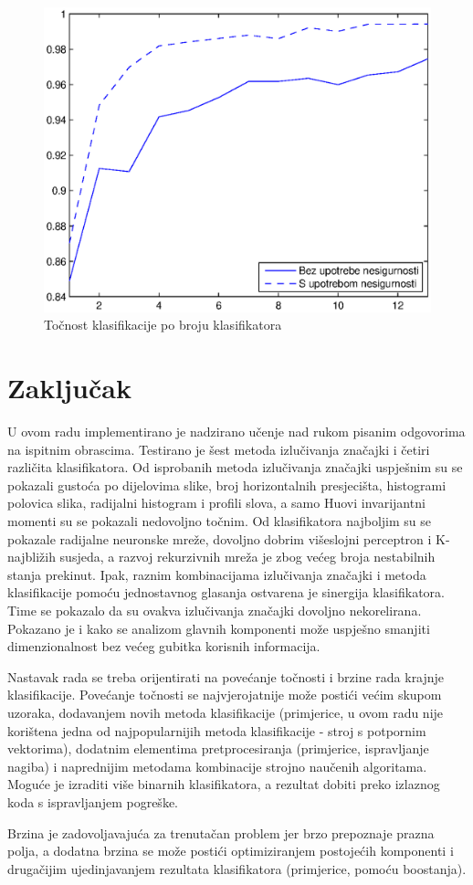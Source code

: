 \documentclass[a4paper,twocolumn,dvipdfm]{article}
\begin{document}
\begin{figure}
\centering
\includegraphics[scale=0.5]{accByClassifCount.eps}
\caption{Točnost klasifikacije po broju klasifikatora}
\label{figure:rezPoBrojuKlas}
\end{figure}


\section{Zaključak}
U ovom radu implementirano je nadzirano učenje nad rukom pisanim odgovorima na
ispitnim obrascima. Testirano je šest metoda izlučivanja značajki i četiri
različita klasifikatora. Od isprobanih metoda izlučivanja značajki uspješnim
su se pokazali gustoća po dijelovima slike, broj horizontalnih presjecišta,
histogrami polovica slika, radijalni histogram i profili slova, a samo Huovi
invarijantni momenti su se pokazali nedovoljno točnim. Od klasifikatora
najboljim su se pokazale radijalne neuronske mreže, dovoljno dobrim višeslojni
perceptron i K-najbližih susjeda, a razvoj rekurzivnih mreža je zbog većeg broja
nestabilnih stanja prekinut. Ipak, raznim kombinacijama izlučivanja
značajki i metoda klasifikacije pomoću jednostavnog glasanja ostvarena je
sinergija klasifikatora. Time se pokazalo da su ovakva izlučivanja značajki
dovoljno nekorelirana. Pokazano je i kako se analizom glavnih komponenti može
uspješno smanjiti dimenzionalnost bez većeg gubitka korisnih informacija.

Nastavak rada se treba orijentirati na povećanje točnosti i brzine rada krajnje
klasifikacije. Povećanje točnosti se najvjerojatnije može postići većim skupom
uzoraka, dodavanjem novih metoda klasifikacije (primjerice, u ovom radu nije
korištena jedna od najpopularnijih metoda klasifikacije - stroj s potpornim
vektorima), dodatnim elementima pretprocesiranja (primjerice, ispravljanje
nagiba) i naprednijim metodama kombinacije strojno naučenih algoritama. Moguće
je izraditi više binarnih klasifikatora, a rezultat dobiti preko izlaznog koda s
ispravljanjem pogreške.

Brzina je zadovoljavajuća za trenutačan problem jer brzo
prepoznaje prazna polja, a dodatna brzina se može postići optimiziranjem
postojećih komponenti i drugačijim ujedinjavanjem rezultata klasifikatora
(primjerice, pomoću boostanja).



\end{document}
